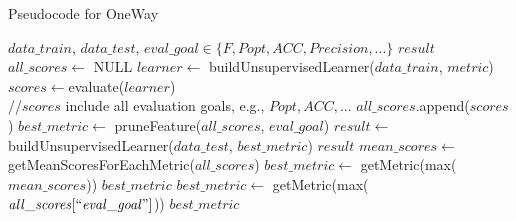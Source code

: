  
\begin{algorithm}[!htp]
\small
\caption{Pseudocode for OneWay}
\begin{algorithmic}[1]
\Require $\mathit{data\_train}$, $\mathit{data\_test}$, $\mathit{eval\_goal} \in \{\mathit{F,Popt,ACC,Precision,...}\}$
\Ensure $\mathit{result}$
\vspace{2mm}
  \State $\mathit{all\_scores} \gets$ NULL
      \State $\mathit{learner}\gets$ buildUnsupervisedLearner($\mathit{data\_train}$, $\mathit{metric}$)
      \State $\mathit{scores} \gets $evaluate($\mathit{learner}$)\\
      \quad \qquad //$\mathit{scores}$ include all evaluation goals, e.g., $\mathit{Popt,ACC,...}$
      \State $\mathit{all\_scores}$.append($\mathit{scores}$)
  \EndFor
  \State $\mathit{best\_metric} \gets$ pruneFeature($\mathit{all\_scores}$, $\mathit{eval\_goal}$)
  \State $\mathit{result} \gets$ buildUnsupervisedLearner($\mathit{data\_test}$, $\mathit{best\_metric}$)
  \State \Return $\mathit{result}$
\EndFunction
{}
    \State $\mathit{ mean\_scores} \gets$ getMeanScoresForEachMetric($\mathit{all\_scores}$)
    \State $ \mathit{best\_metric} \gets$ getMetric(max($\mathit{mean\_scores}$)) 
    \State \Return $\mathit{best\_metric}$
   \Else
     \State $\mathit{best\_metric} \gets$ getMetric(max($\mathit{all\_scores[``eval\_goal"]}$))
     \State\Return $\mathit{best\_metric}$
  \EndIf
\EndFunction
\end{algorithmic}
\label{alg:OneWay}
\end{algorithm}




